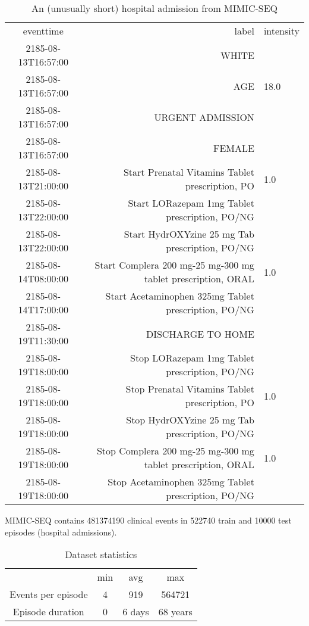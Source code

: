 \begin{table}[H]
    \centering
    \scriptsize
    \begin{tabular}{c|r|l}
    eventtime &	label &	intensity \\
    2185-08-13T16:57:00 &	WHITE	 & \\
    2185-08-13T16:57:00 &	AGE &	18.0 \\
    2185-08-13T16:57:00 &	URGENT ADMISSION &	 \\
    2185-08-13T16:57:00 &	FEMALE &	 \\
    2185-08-13T21:00:00 &	Start Prenatal Vitamins Tablet prescription, PO &	1.0 \\
    2185-08-13T22:00:00 &	Start LORazepam 1mg Tablet prescription, PO/NG &	 \\
    2185-08-13T22:00:00 &	Start HydrOXYzine 25 mg Tab prescription, PO/NG &	 \\
    2185-08-14T08:00:00 &	Start Complera 200 mg-25 mg-300 mg tablet prescription, ORAL &	1.0 \\
    2185-08-14T17:00:00 &	Start Acetaminophen 325mg Tablet prescription, PO/NG &	 \\
    2185-08-19T11:30:00 &	DISCHARGE TO HOME &	 \\
    2185-08-19T18:00:00 &	Stop LORazepam 1mg Tablet prescription, PO/NG &	 \\
    2185-08-19T18:00:00 &	Stop Prenatal Vitamins Tablet prescription, PO &	1.0 \\
    2185-08-19T18:00:00 &	Stop HydrOXYzine 25 mg Tab prescription, PO/NG &	 \\
    2185-08-19T18:00:00 &	Stop Complera 200 mg-25 mg-300 mg tablet prescription, ORAL &	1.0 \\
    2185-08-19T18:00:00 &	Stop Acetaminophen 325mg Tablet prescription, PO/NG &	 \\
    \end{tabular}
    \caption{An (unusually short) hospital admission from MIMIC-SEQ}
\end{table}

MIMIC-SEQ contains 481374190 clinical events in 522740 train and 10000 test episodes (hospital admissions).

\begin{table}[H]
    \centering
    \begin{tabular}{c|c|c|c}
         & min & avg & max \\
         Events per episode & 4 & 919 & 564721 \\
         Episode duration & 0 & 6 days & 68 years \\
    \end{tabular}
    \caption{Dataset statistics}
    \label{tab:stats}
\end{table}

